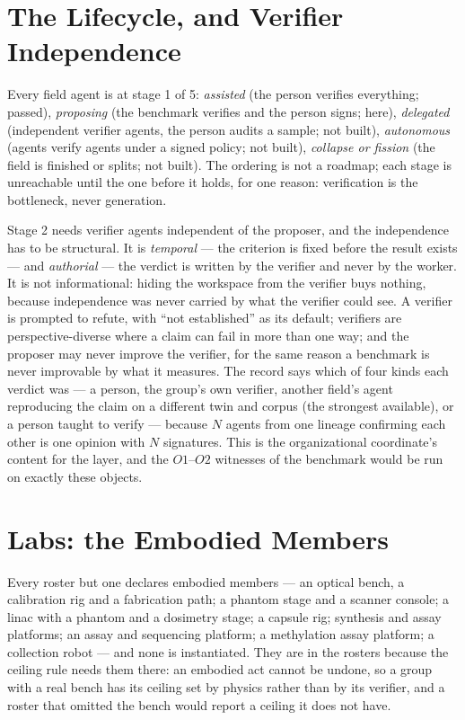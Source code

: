 \section{The Lifecycle, and Verifier Independence}\label{sec:lifecycle}

Every field agent is at stage 1 of 5: \emph{assisted} (the person verifies everything; passed), \emph{proposing} (the benchmark verifies and the person signs; here), \emph{delegated} (independent verifier agents, the person audits a sample; not built), \emph{autonomous} (agents verify agents under a signed policy; not built), \emph{collapse or fission} (the field is finished or splits; not built). The ordering is not a roadmap; each stage is unreachable until the one before it holds, for one reason: verification is the bottleneck, never generation.

Stage 2 needs verifier agents independent of the proposer, and the independence has to be structural. It is \emph{temporal} --- the criterion is fixed before the result exists --- and \emph{authorial} --- the verdict is written by the verifier and never by the worker. It is not informational: hiding the workspace from the verifier buys nothing, because independence was never carried by what the verifier could see. A verifier is prompted to refute, with ``not established'' as its default; verifiers are perspective-diverse where a claim can fail in more than one way; and the proposer may never improve the verifier, for the same reason a benchmark is never improvable by what it measures. The record says which of four kinds each verdict was --- a person, the group's own verifier, another field's agent reproducing the claim on a different twin and corpus (the strongest available), or a person taught to verify --- because $N$ agents from one lineage confirming each other is one opinion with $N$ signatures. This is the organizational coordinate's content for the layer, and the $O1$--$O2$ witnesses of the benchmark would be run on exactly these objects.

\section{Labs: the Embodied Members}\label{sec:labs}

Every roster but one declares embodied members --- an optical bench, a calibration rig and a fabrication path; a phantom stage and a scanner console; a linac with a phantom and a dosimetry stage; a capsule rig; synthesis and assay platforms; an assay and sequencing platform; a methylation assay platform; a collection robot --- and none is instantiated. They are in the rosters because the ceiling rule needs them there: an embodied act cannot be undone, so a group with a real bench has its ceiling set by physics rather than by its verifier, and a roster that omitted the bench would report a ceiling it does not have.

